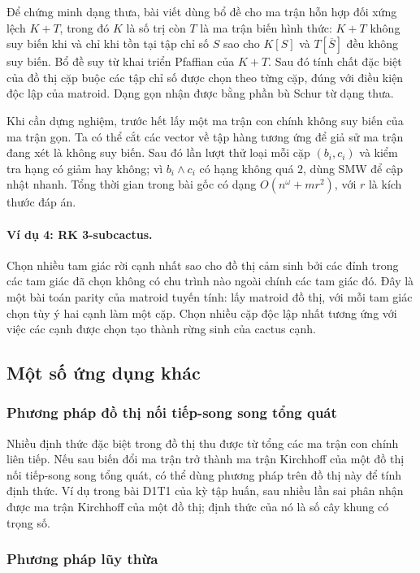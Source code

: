 \documentclass[11pt]{article}
\begin{document}
Để chứng minh dạng thưa, bài viết dùng bổ đề cho ma trận hỗn hợp đối xứng lệch
$K+T$, trong đó $K$ là số trị còn $T$ là ma trận biến hình thức: $K+T$ không suy
biến khi và chỉ khi tồn tại tập chỉ số $S$ sao cho $K[S]$ và $T[\overline S]$
đều không suy biến. Bổ đề suy từ khai triển Pfaffian của $K+T$. Sau đó tính chất
đặc biệt của đồ thị cặp buộc các tập chỉ số được chọn theo từng cặp, đúng với
điều kiện độc lập của matroid. Dạng gọn nhận được bằng phần bù Schur từ dạng
thưa.

Khi cần dựng nghiệm, trước hết lấy một ma trận con chính không suy biến của ma
trận gọn. Ta có thể cắt các vector về tập hàng tương ứng để giả sử ma trận đang
xét là không suy biến. Sau đó lần lượt thử loại mỗi cặp $(b_i,c_i)$ và kiểm tra
hạng có giảm hay không; vì $b_i\wedge c_i$ có hạng không quá $2$, dùng SMW để
cập nhật nhanh. Tổng thời gian trong bài gốc có dạng $O(n^\omega+mr^2)$, với
$r$ là kích thước đáp án.

\paragraph{Ví dụ 4: RK 3-subcactus.}
Chọn nhiều tam giác rời cạnh nhất sao cho đồ thị cảm sinh bởi các đỉnh trong
các tam giác đã chọn không có chu trình nào ngoài chính các tam giác đó. Đây là
một bài toán parity của matroid tuyến tính: lấy matroid đồ thị, với mỗi tam giác
chọn tùy ý hai cạnh làm một cặp. Chọn nhiều cặp độc lập nhất tương ứng với việc
các cạnh được chọn tạo thành rừng sinh của cactus cạnh.

\subsection{Một số ứng dụng khác}

\subsubsection{Phương pháp đồ thị nối tiếp-song song tổng quát}

Nhiều định thức đặc biệt trong đồ thị thu được từ tổng các ma trận con chính
liên tiếp. Nếu sau biến đổi ma trận trở thành ma trận Kirchhoff của một đồ thị
nối tiếp-song song tổng quát, có thể dùng phương pháp trên đồ thị này để tính
định thức. Ví dụ trong bài D1T1 của kỳ tập huấn, sau nhiều lần sai phân nhận
được ma trận Kirchhoff của một đồ thị; định thức của nó là số cây khung có trọng
số.

\subsubsection{Phương pháp lũy thừa}
\end{document}
